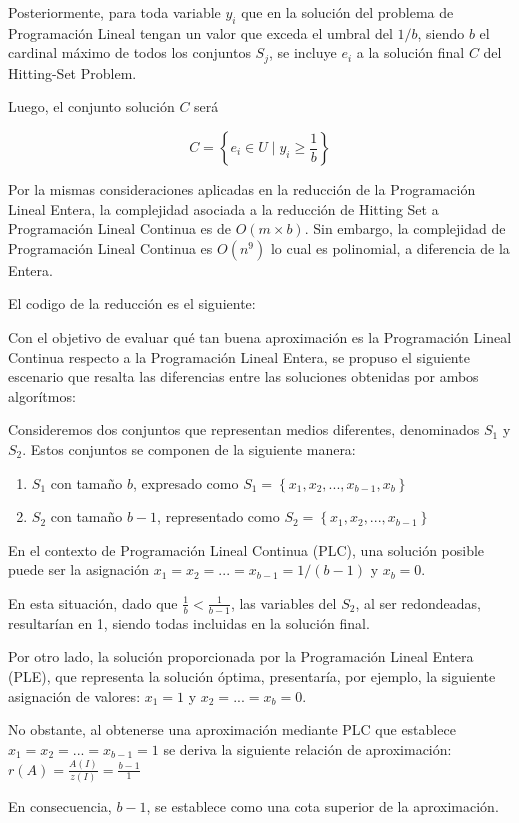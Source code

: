 Posteriormente, para toda variable $y_i$ que en la solución del problema de Programación Lineal tengan un valor que exceda el umbral del $1/b$, siendo $b$ el cardinal máximo de todos los conjuntos $S_j$, se incluye $e_i$ a la solución final $C$ del Hitting-Set Problem.

Luego, el conjunto solución $C$ será

\[
    C = \left\{e_i \in U \mid y_{i} \geq \frac{1}{b}\right\}
\]

Por la mismas consideraciones aplicadas en la reducción de la Programación Lineal Entera, la complejidad asociada a la reducción de Hitting Set a Programación Lineal Continua es de $O(m\times b)$.
Sin embargo, la complejidad de Programación Lineal Continua es $O(n^9)$ lo cual es polinomial, a diferencia de la Entera. 

El codigo de la reducción es el siguiente:



Con el objetivo de evaluar qué tan buena aproximación es la Programación Lineal Continua respecto a la Programación Lineal Entera, se propuso el siguiente escenario que resalta las diferencias entre las soluciones obtenidas por ambos algorítmos:

Consideremos dos conjuntos que representan medios diferentes, denominados $S_1$ y $S_2$. Estos conjuntos se componen de la siguiente manera:
\begin{enumerate}
    \item $S_1$ con tamaño $b$, expresado como $S_1=\left\{x_1, x_2, ..., x_{b-1},  x_b\right\}$
    \item $S_2$ con tamaño $b-1$, representado como $S_2=\left\{x_1, x_2, ..., x_{b-1}\right\}$
\end{enumerate}

En el contexto de Programación Lineal Continua (PLC), una solución posible puede ser la asignación $x_1 = x_2 = ... = x_{b-1} = 1/(b-1)$ y $x_b=0$.

En esta situación, dado que $\frac{1}{b} < \frac{1}{b-1}$, las variables del $S_2$, al ser redondeadas, resultarían en 1, siendo todas incluidas en la solución final.

Por otro lado, la solución proporcionada por la Programación Lineal Entera (PLE), que representa la solución óptima, presentaría, por ejemplo, la siguiente asignación de valores:  $x_1 = 1$ y  $x_2 = ... = x_{b} = 0$. 

No obstante, al obtenerse una aproximación mediante PLC que establece $x_1 = x_2 = ... = x_{b-1} = 1$ se deriva la siguiente relación de aproximación: $r(A)=\frac{A(I)}{z(I)}=\frac{b-1}{1}$

En consecuencia, $b-1$, se establece como una cota superior de la aproximación. 

